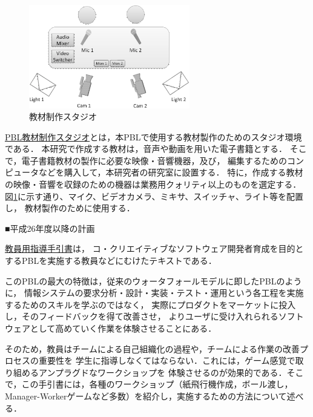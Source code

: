 \documentclass[11pt,a4paper,twoside]{jarticle}
\newcommand{\研究種別}{A}	%
\newcommand{\研究課題名}{コ・クリエイティブなソフトウェア開発者を育成するPBL型教育}
\newcommand{\研究機関名}{産業技術大学院大学}
\newcommand{\研究代表者氏名}{中鉢　欣秀}
\newcommand{\研究代表者氏名ふりがな}{ちゅうばち　よしひで}
\newcommand{\本応募effort}{\KLEffort{18}}	%
\newcommand{\研究期間の最終元号年度}{27}	%
\begin{document}
{    
         \begin{figure}
         	\begin{center}
		         \includegraphics[width=7cm]{figs/studio.eps}
		         \caption{教材制作スタジオ}
		         \label{fig:studio}
	         \end{center}
         \end{figure}

	\vspace{0.5cm}
	\underline{PBL教材制作スタジオ}とは，本PBLで使用する教材製作のためのスタジオ環境である．
	本研究で作成する教材は，音声や動画を用いた電子書籍とする．
	そこで，電子書籍教材の製作に必要な映像・音響機器，及び，
	編集するためのコンピュータなどを購入して，本研究者の研究室に設置する．
	特に，作成する教材の映像・音響を収録のための機器は業務用クォリティ以上のものを選定する．
	図\ref{fig:studio}に示す通り、マイク、ビデオカメラ、ミキサ、スイッチャ、ライト等を配置し，
	教材製作のために使用する．
	
	\begin{flushleft}
		■平成26年度以降の計画
	\end{flushleft}
	
	\underline{教員用指導手引書}は，
	コ・クリエイティブなソフトウェア開発者育成を目的とするPBLを実施する教員などにむけたテキストである．
	
	このPBLの最大の特徴は，従来のウォータフォールモデルに即したPBLのように，
	情報システムの要求分析・設計・実装・テスト・運用という各工程を実施するためのスキルを学ぶのではなく，
	実際にプロダクトをマーケットに投入し，そのフィードバックを得て改善させ，
	よりユーザに受け入れられるソフトウェアとして高めていく作業を体験させることにある．
	
	そのため，教員はチームによる自己組織化の過程や，チームによる作業の改善プロセスの重要性を
	学生に指導しなくてはならない．これには，ゲーム感覚で取り組めるアンプラグドなワークショップを
	体験させるのが効果的である．そこで，この手引書には，各種のワークショップ（紙飛行機作成，ボール渡し，
	Manager-Workerゲームなど多数）を紹介し，実施するための方法について述べる．
	
}
\end{document}
